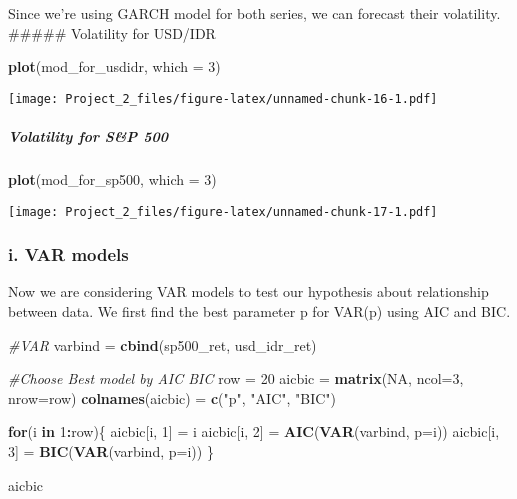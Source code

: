 \documentclass[]{article}
\newenvironment{Shaded}{\begin{snugshade}}{\end{snugshade}}
\newcommand{\KeywordTok}[1]{\textcolor[rgb]{0.13,0.29,0.53}{\textbf{#1}}}
\newcommand{\DataTypeTok}[1]{\textcolor[rgb]{0.13,0.29,0.53}{#1}}
\newcommand{\DecValTok}[1]{\textcolor[rgb]{0.00,0.00,0.81}{#1}}
\newcommand{\StringTok}[1]{\textcolor[rgb]{0.31,0.60,0.02}{#1}}
\newcommand{\CommentTok}[1]{\textcolor[rgb]{0.56,0.35,0.01}{\textit{#1}}}
\newcommand{\OtherTok}[1]{\textcolor[rgb]{0.56,0.35,0.01}{#1}}
\newcommand{\ControlFlowTok}[1]{\textcolor[rgb]{0.13,0.29,0.53}{\textbf{#1}}}
\newcommand{\OperatorTok}[1]{\textcolor[rgb]{0.81,0.36,0.00}{\textbf{#1}}}
\newcommand{\NormalTok}[1]{#1}
\let\oldsubparagraph\subparagraph
\renewcommand{\subparagraph}[1]{\oldsubparagraph{#1}\mbox{}}
\begin{document}
Since we're using GARCH model for both series, we can forecast their
volatility. \#\#\#\#\# Volatility for USD/IDR

\begin{Shaded}
\begin{Highlighting}[]
\KeywordTok{plot}\NormalTok{(mod_for_usdidr, }\DataTypeTok{which =} \DecValTok{3}\NormalTok{)}
\end{Highlighting}
\end{Shaded}

\texttt{[image: Project\_2\_files/figure-latex/unnamed-chunk-16-1.pdf]}

\subparagraph{Volatility for S\&P 500}\label{volatility-for-sp-500}

\begin{Shaded}
\begin{Highlighting}[]
\KeywordTok{plot}\NormalTok{(mod_for_sp500, }\DataTypeTok{which =} \DecValTok{3}\NormalTok{)}
\end{Highlighting}
\end{Shaded}

\texttt{[image: Project\_2\_files/figure-latex/unnamed-chunk-17-1.pdf]}

\subsubsection{i. VAR models}\label{i.-var-models}

Now we are considering VAR models to test our hypothesis about
relationship between data. We first find the best parameter p for VAR(p)
using AIC and BIC.

\begin{Shaded}
\begin{Highlighting}[]
\CommentTok{#VAR}
\NormalTok{varbind =}\StringTok{ }\KeywordTok{cbind}\NormalTok{(sp500_ret, usd_idr_ret)}

\CommentTok{#Choose Best model by AIC BIC}
\NormalTok{row =}\StringTok{ }\DecValTok{20}
\NormalTok{aicbic =}\StringTok{ }\KeywordTok{matrix}\NormalTok{(}\OtherTok{NA}\NormalTok{, }\DataTypeTok{ncol=}\DecValTok{3}\NormalTok{, }\DataTypeTok{nrow=}\NormalTok{row)}
\KeywordTok{colnames}\NormalTok{(aicbic) =}\StringTok{ }\KeywordTok{c}\NormalTok{(}\StringTok{"p"}\NormalTok{, }\StringTok{"AIC"}\NormalTok{, }\StringTok{"BIC"}\NormalTok{)}

\ControlFlowTok{for}\NormalTok{(i }\ControlFlowTok{in} \DecValTok{1}\OperatorTok{:}\NormalTok{row)\{}
\NormalTok{  aicbic[i, }\DecValTok{1}\NormalTok{] =}\StringTok{ }\NormalTok{i}
\NormalTok{  aicbic[i, }\DecValTok{2}\NormalTok{] =}\StringTok{ }\KeywordTok{AIC}\NormalTok{(}\KeywordTok{VAR}\NormalTok{(varbind, }\DataTypeTok{p=}\NormalTok{i))}
\NormalTok{  aicbic[i, }\DecValTok{3}\NormalTok{] =}\StringTok{ }\KeywordTok{BIC}\NormalTok{(}\KeywordTok{VAR}\NormalTok{(varbind, }\DataTypeTok{p=}\NormalTok{i))}
\NormalTok{\}}

\NormalTok{aicbic}
\end{Highlighting}
\end{Shaded}
\end{document}
